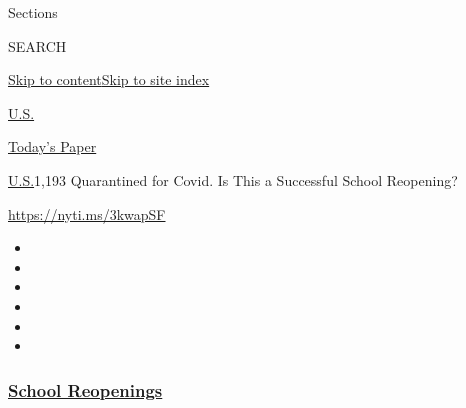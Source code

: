 Sections

SEARCH

\protect\hyperlink{site-content}{Skip to
content}\protect\hyperlink{site-index}{Skip to site index}

\href{https://www.nytimes3xbfgragh.onion/section/us}{U.S.}

\href{https://myaccount.nytimes3xbfgragh.onion/auth/login?response_type=cookie\&client_id=vi}{}

\href{https://www.nytimes3xbfgragh.onion/section/todayspaper}{Today's
Paper}

\href{/section/us}{U.S.}\textbar{}1,193 Quarantined for Covid. Is This a
Successful School Reopening?

\url{https://nyti.ms/3kwapSF}

\begin{itemize}
\item
\item
\item
\item
\item
\item
\end{itemize}

\hypertarget{school-reopenings}{%
\subsubsection{\texorpdfstring{\href{https://www.nytimes3xbfgragh.onion/spotlight/schools-reopening?name=styln-coronavirus-schools-reopening\&region=TOP_BANNER\&block=storyline_menu_recirc\&action=click\&pgtype=Article\&impression_id=4ec9b8f0-f2a5-11ea-ac64-8d7d25b062bd\&variant=undefined}{School
Reopenings}}{School Reopenings}}\label{school-reopenings}}

